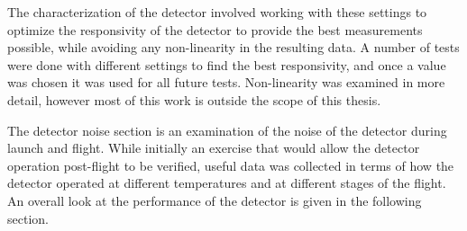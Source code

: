 The characterization of the detector involved working with these settings to optimize the responsivity of the detector to provide the best measurements possible, while avoiding any non-linearity in the resulting data. A number of tests were done with different settings to find the best responsivity, and once a value was chosen it was used for all future tests. Non-linearity was examined in more detail, however most of this work is outside the scope of this thesis.

The detector noise section is an examination of the noise of the detector during launch and flight. While initially an exercise that would allow the detector operation post-flight to be verified, useful data was collected in terms of how the detector operated at different temperatures and at different stages of the flight. An overall look at the performance of the detector is given in the following section.